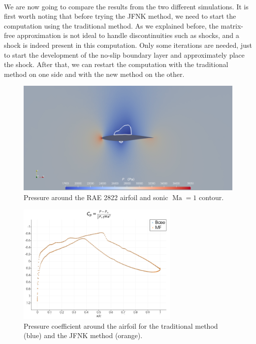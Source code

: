 
        \paragraph{}
        We are now going to compare the results from the two different simulations.
        It is first worth noting that before trying the JFNK method, we need to start the computation using the traditional method.
        As we explained before, the matrix-free approximation is not ideal to handle discontinuities such as shocks, and a shock is indeed present in this computation.
        Only some iterations are needed, just to start the development of the no-slip boundary layer and approximately place the shock.
        After that, we can restart the computation with the traditional method on one side and with the new method on the other.

        \begin{figure}
          \centering
          \includegraphics[width=\textwidth]{figures/rae_field.png}
          \caption{Pressure around the RAE 2822 airfoil and sonic $\operatorname{Ma} = 1$ contour.}
          \label{fig:rae_field}
        \end{figure}

        \begin{figure}
          \centering
          \includegraphics[width=0.7\textwidth]{figures/rae_cp.png}
          \caption{Pressure coefficient around the airfoil for the traditional method (blue) and the JFNK method (orange).}
          \label{fig:rae_cp}
        \end{figure}

